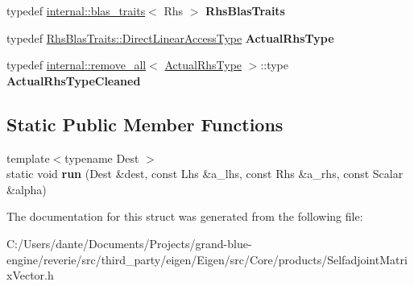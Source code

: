 \begin{DoxyCompactItemize}
\item 
\mbox{\label{struct_eigen_1_1internal_1_1selfadjoint__product__impl_3_01_lhs_00_01_lhs_mode_00_01false_00_01_rhs_00_010_00_01true_01_4_ae819ff714c2a9d2c9bc5ac7dc315bd0e}} 
typedef \mbox{\hyperlink{struct_eigen_1_1internal_1_1blas__traits}{internal\+::blas\+\_\+traits}}$<$ Rhs $>$ {\bfseries Rhs\+Blas\+Traits}
\item 
\mbox{\label{struct_eigen_1_1internal_1_1selfadjoint__product__impl_3_01_lhs_00_01_lhs_mode_00_01false_00_01_rhs_00_010_00_01true_01_4_aa64be4897e7ee0bd9f3a6e040a359064}} 
typedef \mbox{\hyperlink{struct_eigen_1_1internal_1_1true__type}{Rhs\+Blas\+Traits\+::\+Direct\+Linear\+Access\+Type}} {\bfseries Actual\+Rhs\+Type}
\item 
\mbox{\label{struct_eigen_1_1internal_1_1selfadjoint__product__impl_3_01_lhs_00_01_lhs_mode_00_01false_00_01_rhs_00_010_00_01true_01_4_adc2ed77f11c82a4d8111f3c041004589}} 
typedef \mbox{\hyperlink{struct_eigen_1_1internal_1_1remove__all}{internal\+::remove\+\_\+all}}$<$ \mbox{\hyperlink{struct_eigen_1_1internal_1_1true__type}{Actual\+Rhs\+Type}} $>$\+::type {\bfseries Actual\+Rhs\+Type\+Cleaned}
\end{DoxyCompactItemize}
\subsection*{Static Public Member Functions}
\begin{DoxyCompactItemize}
\item 
\mbox{\label{struct_eigen_1_1internal_1_1selfadjoint__product__impl_3_01_lhs_00_01_lhs_mode_00_01false_00_01_rhs_00_010_00_01true_01_4_a27c075c8c1e30a437d3e8ca0bafb2bf7}} 
{\footnotesize template$<$typename Dest $>$ }\\static void {\bfseries run} (Dest \&dest, const Lhs \&a\+\_\+lhs, const Rhs \&a\+\_\+rhs, const Scalar \&alpha)
\end{DoxyCompactItemize}


The documentation for this struct was generated from the following file\+:\begin{DoxyCompactItemize}
\item 
C\+:/\+Users/dante/\+Documents/\+Projects/grand-\/blue-\/engine/reverie/src/third\+\_\+party/eigen/\+Eigen/src/\+Core/products/Selfadjoint\+Matrix\+Vector.\+h\end{DoxyCompactItemize}
